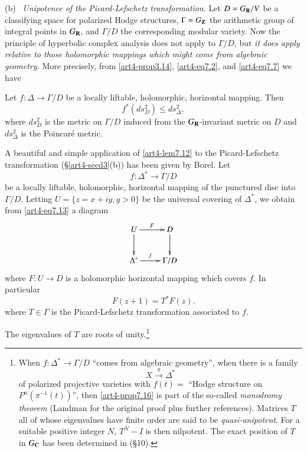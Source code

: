\noindent
(b)~ \textit{Unipotence of the Picard-Lefschetz transformation}. Let $D= G_{\mathbf{R}} / V$ be a classifying space for polarized Hodge structures, $\Gamma = G_{\mathbf{Z}}$ the arithmetic group of integral points in $G_{\mathbf{R}}$, and $\Gamma / D$ the corresponding modular variety. Now the principle of hyperbolic complex analysis does not apply to $\Gamma/D$, but \textit{it does apply relative to those holomorphic mappings which might come from algebraic geometry.} More precisely, from \eqref{art4-prop3.14}, \eqref{art4-eq7.2}, and \eqref{art4-eq7.7} we have

\setcounter{lemma}{11}
\begin{lemma}\label{art4-lem7.12}
Let $f : \Delta \to \Gamma / D$ be a locally liftable, holomorphic, horizontal mapping. Then 
$$
f^\ast (ds^2_D) \leqslant ds^2_\Delta,
$$\pageoriginale
where $ds^2_D$ is the metric on $\Gamma/D$ induced from the $G_{\mathbf{R}}$-invariant metric on $D$ and $ds^2_\Delta$ is the Poincar\'e metric. 
\end{lemma}

A beautiful and simple application of \eqref{art4-lem7.12} to the Picard-Lefschetz transformation (\S \ref{art4-secd3}(b)) has been given by Borel. Let
\setcounter{equation}{12}
\begin{equation}
f : \Delta^\ast \to \Gamma / D\label{art4-eq7.13}
\end{equation}
be a locally liftable, holomorphic, horizontal mapping of the punctured disc into $\Gamma/ D$. Letting $U = \{z = x + iy, y > 0\}$ be the universal covering of $\Delta^\ast$, we obtain from \eqref{art4-eq7.13} a diagram 
\begin{equation}
\xymatrix{
U\ar[r]^-F \ar[d] & D \ar[d]\\
\Delta^\ast \ar[r]^-f & \Gamma / D}
\label{art4-eq7.14}
\end{equation}
where $F : U \to D$ is a holomorphic horizontal mapping which covers $f$. In particular
\begin{equation}
F(z+1) = T^\ast F (z). \label{art4-eq7.15}
\end{equation}
where $T \in \Gamma$ is the Picard-Lefschetz transformation associated to $f$.

\setcounter{proposition}{15}
\begin{proposition}[Borel]\label{art4-prop7.16}
The eigenvalues of $T$ are roots of unity.\footnote[30]{When $f: \Delta^\ast \to \Gamma / D$ ``comes from algebraic geometry'', \ie when there is a family
$$
X \xrightarrow{\pi} \Delta^\ast 
$$
of polarized projective varieties with $f(t) = $ ``Hodge structure on $P^n (\pi^{-1} (t))$'', then \eqref{art4-prop7.16} is part of the so-called \textit{monodromy theorem} (\cf Landman \cite{art4-key35} for the original proof plus further references). Matrices $T$ all of whose eigenvalues have finite order are said to be \textit{quasi-unipotent}. For a suitable positive integer $N$, $T^N -I$ is then nilpotent. The exact position of $T$ in $G_{\mathbf{C}}$ has been determined  in \cite{art4-key41} (\cf \S 10).}
\end{proposition}

